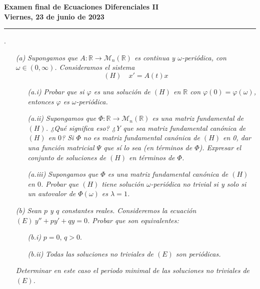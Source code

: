 \documentclass[11pt]{report}
\newcommand{\R}{\mathbb R}
\begin{document}
\begin{center}
    \textbf{Examen final de Ecuaciones Diferenciales II} \\
    \textbf{Viernes, 23 de junio de 2023}
\end{center}

\hrule

\vspace{4mm}

. \begin{itemize}
    \item[\textit{(a)}] \textit{Supongamos que $A \colon \R \to \mathcal{M}_n(\R)$ es continua y $\omega$-periódica, con $\omega \in (0,\infty)$. Consideramos el sistema}
    \[(H) \quad x'=A(t)x\]
    \begin{itemize}
        \item[\textit{(a.i)}] \textit{Probar que si $\varphi$ es una solución de $(H)$ en $\R$ con $\varphi(0)=\varphi(\omega)$, entonces $\varphi$ es $\omega$-periódica.}
        \item[\textit{(a.ii)}] \textit{Supongamos que $\Phi \colon \R \to \mathcal{M}_n(\R)$ es una matriz fundamental de $(H)$. ¿Qué significa eso? ¿Y que sea matriz fundamental canónica de $(H)$ en $0$? Si $\Phi$ no es matriz fundamental canónica de $(H)$ en 0, dar una función matricial $\Psi$ que sí lo sea (en términos de $\Phi$). Expresar el conjunto de soluciones de $(H)$ en términos de $\Phi$.}
        \item[\textit{(a.iii)}] \textit{Supongamos que $\Phi$ es una matriz fundamental canónica de $(H)$ en $0$. Probar que $(H)$ tiene solución $\omega$-periódica no trivial si y solo si un autovalor de $\Phi(\omega)$ es $\lambda=1$.}
    \end{itemize}
    \item[\textit{(b)}] \textit{Sean $p$ y $q$ constantes reales. Consideremos la ecuación $(E) \ y''+py'+qy=0$. Probar que son equivalentes:}
    \begin{itemize}
        \item[\textit{(b.i)}] $p=0$, $q>0$.
        \item[\textit{(b.ii)}] \textit{Todas las soluciones no triviales de $(E)$ son periódicas.}
    \end{itemize}
    \textit{Determinar en este caso el periodo minimal de las soluciones no triviales de $(E)$.}
\end{itemize}

\vspace{2mm}
\end{document}
